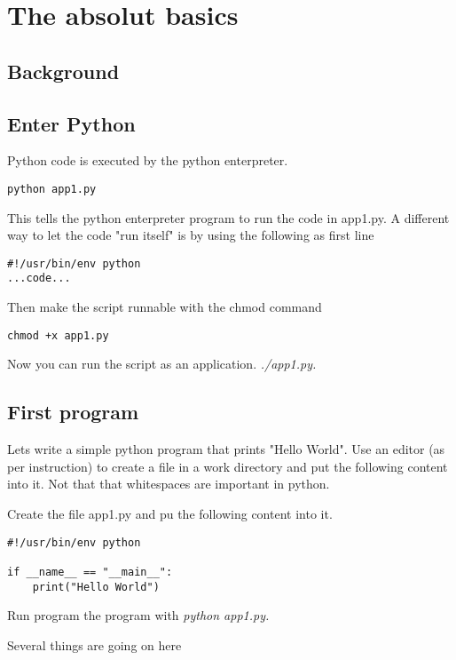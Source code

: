 \section{The absolut basics}

\subsection{Background}

\subsection{Enter Python}

Python code is executed by the python enterpreter. 
\begin{verbatim}
python app1.py
\end{verbatim}
This tells the python enterpreter program to run the code in app1.py.
A different way to let the code "run itself" is by using the following as first line
\begin{verbatim}
#!/usr/bin/env python
...code...
\end{verbatim}
Then make the script runnable with the chmod command
\begin{verbatim}
chmod +x app1.py
\end{verbatim}
Now you can run the script as an application. \it{./app1.py}.

\subsection{First program}

Lets write a simple python program that prints "Hello World".
Use an editor (as per instruction) to create a file in  a work directory and put the following content into it. 
Not that that whitespaces are important in python.

Create the file app1.py and pu the following content into it.
\begin{verbatim}
#!/usr/bin/env python

if __name__ == "__main__":
    print("Hello World")

\end{verbatim}
Run program the program with \it{python app1.py}.

Several things are going on here

